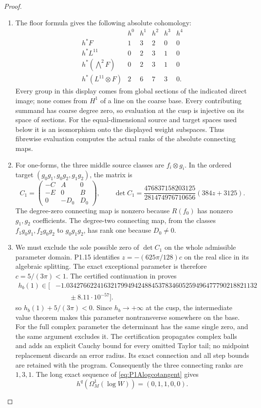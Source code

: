\begin{proof}
\begin{enumerate}[label=\arabic*.]
\item The floor formula gives the following absolute cohomology:
\[
\begin{array}{c|ccccc}
&h^0&h^1&h^2&h^3&h^4\\\hline
h^*F&1&3&2&0&0\\
h^*L^{11}&0&2&3&1&0\\
h^*(\bigwedge^2F)&0&2&3&1&0\\
h^*(L^{11}\otimes F)&2&6&7&3&0.
\end{array}
\]
Every group in this display comes from global sections of the
indicated direct image; none comes from $H^1$ of a line on the
coarse base. Every contributing summand has coarse degree zero,
so evaluation at the cusp is injective on its space of sections.
For the equal-dimensional source and target spaces used below
it is an isomorphism onto the displayed weight subspaces.
Thus fibrewise evaluation computes the actual ranks of the
absolute connecting maps.

\item For one-forms, the three middle source classes are $f_i\otimes g_i$.
In the ordered target $(g_0g_1,g_0g_2,g_1g_2)$, the matrix is
\[
C_1=\begin{pmatrix}-C&A&0\\-E&0&B\\0&-D_0&D_0\end{pmatrix},
\qquad
\det C_1=
\frac{476837158203125}{281474976710656}(384z+3125).
\]
The degree-zero connecting map is nonzero because $R(f_0)$
has nonzero $g_1,g_2$ coefficients. The degree-two connecting
map, from the classes $f_1g_0g_1,f_2g_0g_2$ to $g_0g_1g_2$,
has rank one because $D_0\ne0$.

\item We must exclude the sole possible zero of $\det C_1$ on the
whole admissible parameter domain. P1.15 identifies
$z=-(625\pi/128)c$ on the real slice in its algebraic splitting.
The exact exceptional parameter is therefore $c=5/(3\pi)<1$.
The certified continuation in
 proves
\[
\begin{aligned}
h_b(1)\in\bigl[&
-1.03427662241632179949424884537834605259496477790218821132\\
&\qquad\mathbin{\pm}8.11\cdot10^{-57}\bigr].
\end{aligned}
\]
so $h_b(1)+5/(3\pi)<0$. Since $h_b\to+\infty$ at the cusp,
the intermediate value theorem makes this parameter
nontransverse somewhere on the base. For the full complex
parameter the determinant has the same single zero, and the
same argument excludes it. The certification propagates complex
balls and adds an explicit Cauchy bound for every omitted
Taylor tail; no midpoint replacement discards an error radius.
Its exact connection and all step bounds are retained with the
program. Consequently the three connecting ranks are $1,3,1$.
The long exact sequence of \eqref{eq:P1Alogcotangent} gives
\[
h^q(\Omega_M^1(\log W))=(0,1,1,0,0).
\]


\end{enumerate}
\end{proof}
